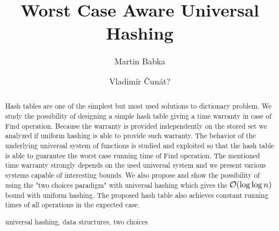 \documentclass[runningheads,a4paper]{llncs}
\newcommand{\keywords}[1]{\par\addvspace\baselineskip
\noindent\keywordname\enspace\ignorespaces#1}
\begin{document}
\mainmatter

\author{Martin Babka
\and Vladimír Čunát?}

\title{Worst Case Aware Universal Hashing}



\maketitle

\begin{abstract}
Hash tables are one of the simplest but most used solutions to dictionary problem. 
We study the possibility of designing a simple hash table giving a time warranty in case of Find operation.
Because the warranty is provided independently on the stored set we analyzed if uniform hashing is able to provide such warranty.
The behavior of the underlying universal system of functions is studied and exploited so that the hash table is able to guarantee the worst case running time of Find operation.
The mentioned time warranty strongly depends on the used universal system and we present various systems capable of interesting bounds. 
We also propose and show the possibility of using the "two choices paradigm" with universal hashing which gives the $\mathcal{O}(\log \log n)$ bound with uniform hashing.
The proposed hash table also achieves constant running times of all operations in the expected case.

\keywords{universal hashing, data structures, two choices}
\end{abstract}








\end{document}
